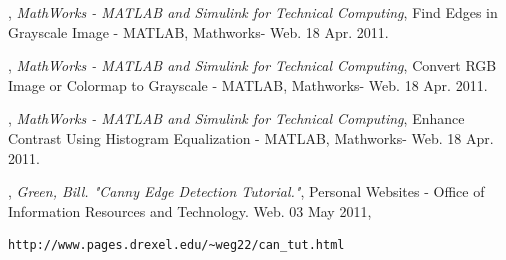 \documentclass[12pt]{article}
\begin{document}
\begin{thebibliography}{9}

 ,
\emph{MathWorks - MATLAB and Simulink for Technical Computing},
Find Edges in Grayscale Image - MATLAB,
Mathworks- Web. 18 Apr. 2011.

 ,
\emph{MathWorks - MATLAB and Simulink for Technical Computing},
Convert RGB Image or Colormap to Grayscale - MATLAB,
Mathworks- Web. 18 Apr. 2011.

 ,
\emph{MathWorks - MATLAB and Simulink for Technical Computing},
Enhance Contrast Using Histogram Equalization - MATLAB,
Mathworks- Web. 18 Apr. 2011.

 ,
\emph{Green, Bill. "Canny Edge Detection Tutorial."},
 Personal Websites - Office of Information Resources and Technology. Web. 03 May 2011,
\begin{verbatim}
http://www.pages.drexel.edu/~weg22/can_tut.html 
\end{verbatim} 
\end{thebibliography}
\end{document}
